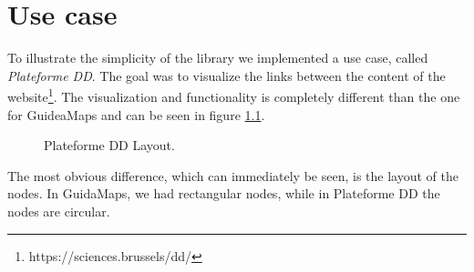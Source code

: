 \chapter{Use case}\label{ch:usecase}
To illustrate the simplicity of the library we implemented a use case, called \textit{Plateforme DD}. The goal was to visualize the links between the content of the website\footnote{https://sciences.brussels/dd/}. The visualization and functionality is completely different than the one for GuideaMaps and can be seen in figure \ref{fig:plateforme-dd}.\\

\begin{figure}[H]
	\centering
	\caption{Plateforme DD Layout.}
	\label{fig:plateforme-dd}
\end{figure}

The most obvious difference, which can immediately be seen, is the layout of the nodes. In GuidaMaps, we had rectangular nodes, while in Plateforme DD the nodes are circular. 